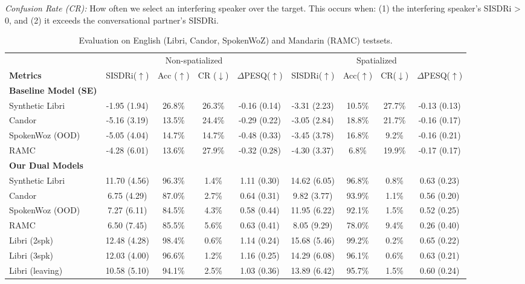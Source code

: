 \item {\it Confusion Rate (CR):}  How often we select an interfering speaker over the target. This occurs when: (1) the interfering speaker's SISDRi > 0, and (2) it exceeds the conversational partner's SISDRi.

\squishend




\begin{table}[t!]
\caption{Evaluation on English (Libri, Candor, SpokenWoZ) and Mandarin (RAMC) testsets.}
\vskip -0.1in
\centering
  \setlength{\tabcolsep}{5.3pt}
{\footnotesize
\begin{tabular}{lcccccccc}
\toprule
& \multicolumn{4}{c}{Non-spatialized} & \multicolumn{4}{c}{Spatialized} \\
\cmidrule(r){2-5} \cmidrule(l){6-9}
\textbf{Metrics} & SISDRi($\uparrow$) & Acc ($\uparrow$) & CR ($\downarrow$) & $\Delta$PESQ($\uparrow$) & SISDRi($\uparrow$) & Acc($\uparrow$) & CR($\downarrow$)  & $\Delta$PESQ($\uparrow$) \\
\midrule
\textbf{Baseline Model (SE)} &&&&&&&&\\
\midrule
Synthetic Libri & -1.95 (1.94) & 26.8\% & 26.3\% & -0.16 (0.14) & -3.31 (2.23) & 10.5\% & 27.7\% & -0.13 (0.13)\\
Candor  & -5.16 (3.19) & 13.5\% & 24.4\% & -0.29 (0.22) & -3.05 (2.84) & 18.8\% & 21.7\% & -0.16 (0.17)\\
SpokenWoz (OOD) & -5.05 (4.04) & 14.7\% & 14.7\% & -0.48 (0.33) & -3.45 (3.78) & 16.8\% & 9.2\% & -0.16 (0.21)\\
RAMC  & -4.28 (6.01) & 13.6\% & 27.9\% & -0.32 (0.28) & -4.30 (3.37) & 6.8\% & 19.9\% & -0.17 (0.17)\\
\midrule
\textbf{Our Dual Models} &&&&&&\\
\midrule
Synthetic Libri & 11.70 (4.56) & 96.3\% & 1.4\% & 1.11 (0.30) & 14.62 (6.05) & 96.8\% & 0.8\% & 0.63 (0.23) \\
Candor  &  6.75 (4.29) & 87.0\% & 2.7\% & 0.64 (0.31) & 9.82 (3.77) & 93.9\% & 1.1\% & 0.56 (0.20)\\
SpokenWoz (OOD)  & 7.27 (6.11) & 84.5\% & 4.3\% & 0.58 (0.44) &11.95 (6.22) & 92.1\% & 1.5\% & 0.52 (0.25) \\
RAMC  & 6.50 (7.45) & 85.5\% & 5.6\% & 0.63 (0.41) & 8.05 (9.29) & 78.0\% & 9.4\% & 0.26 (0.40) \\
\midrule
Libri (2spk) & 12.48 (4.28) & 98.4\% & 0.6\% & 1.14 (0.24) & 15.68 (5.46) & 99.2\% & 0.2\% &  0.65 (0.22) \\
Libri (3spk)  & 12.03 (4.00) & 96.6\% & 1.2\% & 1.16 (0.25) & 14.29 (6.08) & 96.1\% & 0.6\% & 0.63 (0.21) \\
Libri (leaving) & 10.58 (5.10) & 94.1\% & 2.5\% & 1.03 (0.36) & 13.89 (6.42) & 95.7\% & 1.5\% & 0.60 (0.24)\\
\bottomrule
\end{tabular}
}
\label{tab:big_results}
\vskip -0.15in
\end{table}

